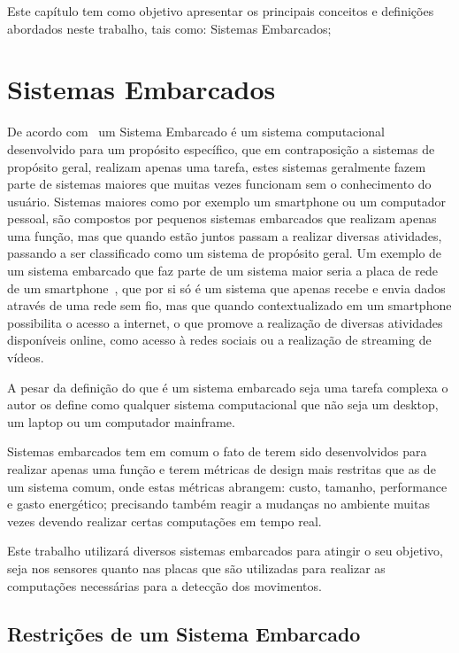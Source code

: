 \label{chapter:conceitos}
Este capítulo tem como objetivo apresentar os principais conceitos e definições abordados neste trabalho, tais como:
Sistemas Embarcados;


\section{Sistemas Embarcados}
De acordo com~\cite{VAHID:2001} um Sistema Embarcado é um sistema computacional desenvolvido para um propósito específico, que em contraposição a sistemas de propósito geral, realizam apenas uma tarefa, estes sistemas geralmente fazem parte de sistemas maiores que muitas vezes funcionam sem o conhecimento do usuário. Sistemas maiores como por exemplo um smartphone ou um computador pessoal, são compostos por pequenos sistemas embarcados que realizam apenas uma função, mas que quando estão juntos passam a realizar diversas atividades, passando a ser classificado como um sistema de propósito geral. Um exemplo de um sistema embarcado que faz parte de um sistema maior seria a placa de rede de um smartphone~\cite{qualcomm_2017}, que por si só é um sistema que apenas recebe e envia dados através de uma rede sem fio, mas que quando contextualizado em um smartphone possibilita o acesso a internet, o que promove a realização de diversas atividades disponíveis online, como acesso à redes sociais ou a realização de streaming de vídeos.

A pesar da definição do que é um sistema embarcado seja uma tarefa complexa o autor os define como qualquer sistema computacional que não seja um desktop, um laptop ou um computador mainframe.


Sistemas embarcados tem em comum o fato de terem sido desenvolvidos para realizar apenas uma função e terem métricas de design mais restritas que as de um sistema comum, onde estas métricas abrangem: custo, tamanho, performance e gasto energético; precisando também reagir a mudanças no ambiente muitas vezes devendo realizar certas computações em tempo real.


Este trabalho utilizará diversos sistemas embarcados para atingir o seu objetivo, seja nos sensores quanto nas placas que são utilizadas para realizar as computações necessárias para a detecção dos  movimentos.

\subsection{Restrições de um Sistema Embarcado}

